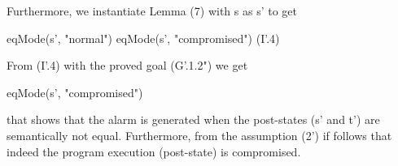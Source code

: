 \documentclass[conference]{IEEEtran}
\begin{document}
\noindent Furthermore, we instantiate Lemma (7) with
s as s' to get

\begin{center}
 eqMode(s', "normal")  eqMode(s', "compromised")  \hspace*{0cm} (I'.4)
\end{center}

\noindent From (I'.4) with the proved goal (G'.1.2") we get

\begin{center}
eqMode(s', "compromised")
\end{center}

that shows that the alarm is generated when the post-states (s' and t') are semantically not equal. Furthermore, from the assumption (2') if follows that indeed the program execution (post-state) is compromised.
\end{document}
